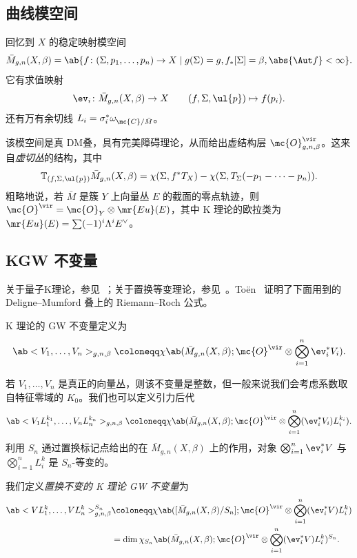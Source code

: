 \subsection{曲线模空间}%
\label{sub:Moduli of curves}

回忆到 \(X\) 的稳定映射模空间
\[ \bar{M}_{g,n}(X, \beta) = \ab\{ f \colon (\Sigma, p_1, \ldots, p_n) \to X \mid g(\Sigma) = g, f_*[\Sigma] = \beta, \abs{\Aut f} < \infty \}. \]
它有求值映射
\[ \ev_i \colon \bar{M}_{g,n}(X, \beta) \to X \qquad (f, \Sigma, \ul{p}) \mapsto f(p_i). \]
还有万有余切线 \(L_i = \sigma_i^* \omega_{ \mc{C}/\bar{M} }\)。

该模空间是真 DM叠，具有完美障碍理论，从而给出虚结构层 \(\mc{O}^{\vir}_{g,n,\beta}\)。这来自\textit{虚切丛}的结构，其中
\[ \mathbb{T}_{(f, \Sigma, \ul{p})} \bar{M}_{g,n}(X, \beta) = \chi(\Sigma, f^* T_X) - \chi(\Sigma, T_{\Sigma}(-p_1 - \cdots - p_n)). \]
粗略地说，若 \(\bar{M}\) 是簇 \(Y\) 上向量丛 \(E\) 的截面的零点轨迹，则 \(\mc{O}^{\vir} = \mc{O}_Y \otimes \mr{Eu}(E)\)，其中 K 理论的欧拉类为 \(\mr{Eu}(E) = \sum (-1)^i \Lambda^i E^{\vee}\)。

\subsection{KGW 不变量}%
\label{sub:KGW invariants}

关于量子K理论，参见~\cite{Lee2004}；关于置换等变理论，参见~\cite{Givental2017K1,GiventalK7}。To\"en~\cite{Toen1999} 证明了下面用到的 Deligne--Mumford 叠上的 Riemann--Roch 公式。

\begin{defn}
    K 理论的 GW 不变量定义为
    \[ \ab<V_1, \ldots, V_n>_{g,n,\beta} \coloneqq \chi\ab(\bar{M}_{g,n}(X, \beta); \mc{O}^{\vir} \otimes \bigotimes_{i=1}^n \ev_i^* V_i). \]
\end{defn}

若 \(V_1, \ldots, V_n\) 是真正的向量丛，则该不变量是整数，但一般来说我们会考虑系数取自特征零域的 \(K_0\)。我们也可以定义引力后代
\[ \ab<V_1 L_1^{k_1}, \ldots, V_n L_n^{k_n}>_{g,n,\beta} \coloneqq \chi\ab(\bar{M}_{g,n}(X, \beta); \mc{O}^{\vir} \otimes \bigotimes_{i=1}^n ( \ev_i^* V_i )L_i^{k_i} ). \]
利用 \(S_n\) 通过置换标记点给出的在 \(\bar{M}_{g,n}(X, \beta)\) 上的作用，对象 \(\bigotimes_{i=1}^n \ev_i^* V\) 与 \(\bigotimes_{i=1}^n L_i^k\) 是 \(S_n\)-等变的。

\begin{defn}
    我们定义\textit{置换不变的 K 理论 GW 不变量}为
    \begin{align*}
        \ab<V L_1^k, \ldots, V L_n^k>_{g,n,\beta}^{S_n} &\coloneqq \chi\ab([ \bar{M}_{g,n}(X, \beta)/S_n ]; \mc{O}^{\vir} \otimes \bigotimes_{i=1}^n ( \ev_i^* V ) L_i^k) \\
        &= \dim \chi_{S_n} \ab(\bar{M}_{g,n}(X, \beta); \mc{O}^{\vir} \otimes \bigotimes_{i=1}^n ( \ev_i^* V ) L_i^k )^{S_n}.
    \end{align*}
\end{defn}


